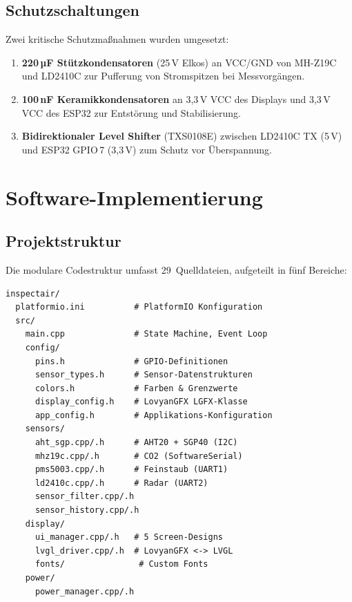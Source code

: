\subsection{Schutzschaltungen}

Zwei kritische Schutzmaßnahmen wurden umgesetzt:

\begin{enumerate}[nosep]
\item \textbf{220\,µF Stützkondensatoren} (25\,V Elkos) an VCC/GND von MH-Z19C und LD2410C zur Pufferung von Stromspitzen bei Messvorgängen.
\item \textbf{100\,nF Keramikkondensatoren} an 3,3\,V VCC des Displays und 3,3\,V VCC des ESP32 zur Entstörung und Stabilisierung.
\item \textbf{Bidirektionaler Level Shifter} (TXS0108E) zwischen LD2410C TX (5\,V) und ESP32 GPIO\,7 (3,3\,V) zum Schutz vor Überspannung.
\end{enumerate}

\section{Software-Implementierung}
\label{sec:sw_impl}

\subsection{Projektstruktur}

Die modulare Codestruktur umfasst 29~Quelldateien, aufgeteilt in fünf Bereiche:

\begin{lstlisting}[language={},numbers=none,basicstyle=\footnotesize\ttfamily]
inspectair/
  platformio.ini          # PlatformIO Konfiguration
  src/
    main.cpp              # State Machine, Event Loop
    config/
      pins.h              # GPIO-Definitionen
      sensor_types.h      # Sensor-Datenstrukturen
      colors.h            # Farben & Grenzwerte
      display_config.h    # LovyanGFX LGFX-Klasse
      app_config.h        # Applikations-Konfiguration
    sensors/
      aht_sgp.cpp/.h      # AHT20 + SGP40 (I2C)
      mhz19c.cpp/.h       # CO2 (SoftwareSerial)
      pms5003.cpp/.h      # Feinstaub (UART1)
      ld2410c.cpp/.h      # Radar (UART2)
      sensor_filter.cpp/.h
      sensor_history.cpp/.h
    display/
      ui_manager.cpp/.h   # 5 Screen-Designs
      lvgl_driver.cpp/.h  # LovyanGFX <-> LVGL
      fonts/               # Custom Fonts
    power/
      power_manager.cpp/.h
\end{lstlisting}

